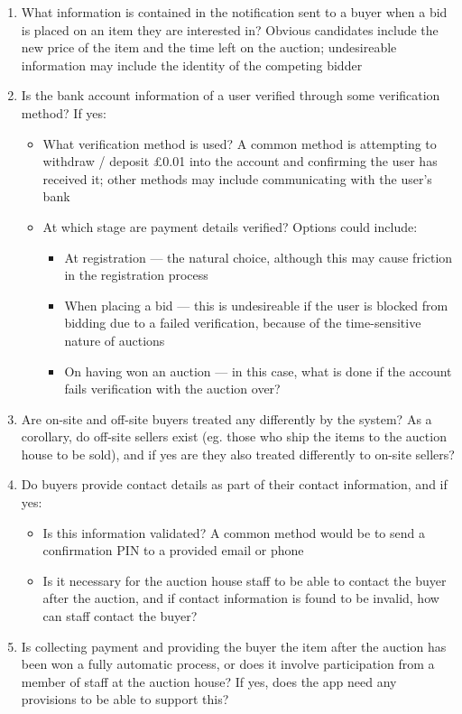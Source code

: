 \documentclass[titlepage, 12pt]{extarticle}
\begin{document}
\begin{enumerate}
\begin{itemize}
  \end{itemize}
\item What information is contained in the notification sent to a buyer when a bid is placed on an item they are interested in? Obvious candidates include the new price of the item and the time left on the auction; undesireable information may include the identity of the competing bidder
\item Is the bank account information of a user verified through some verification method? If yes:
  \begin{itemize}
  \item What verification method is used? A common method is attempting to withdraw / deposit \pounds 0.01 into the account and confirming the user has received it; other methods may include communicating with the user's bank
  \item At which stage are payment details verified? Options could include:
    \begin{itemize}
    \item At registration --- the natural choice, although this may cause friction in the registration process
    \item When placing a bid --- this is undesireable if the user is blocked from bidding due to a failed verification, because of the time-sensitive nature of auctions
    \item On having won an auction --- in this case, what is done if the account fails verification with the auction over?
    \end{itemize}
  \end{itemize}
\item Are on-site and off-site buyers treated any differently by the system? As a corollary, do off-site sellers exist (eg. those who ship the items to the auction house to be sold), and if yes are they also treated differently to on-site sellers?
\item Do buyers provide contact details as part of their contact information, and if yes:
  \begin{itemize}
  \item Is this information validated? A common method would be to send a confirmation PIN to a provided email or phone
  \item Is it necessary for the auction house staff to be able to contact the buyer after the auction, and if contact information is found to be invalid, how can staff contact the buyer?
  \end{itemize}
\item Is collecting payment and providing the buyer the item after the auction has been won a fully automatic process, or does it involve participation from a member of staff at the auction house? If yes, does the app need any provisions to be able to support this?

\end{enumerate}
\end{document}
